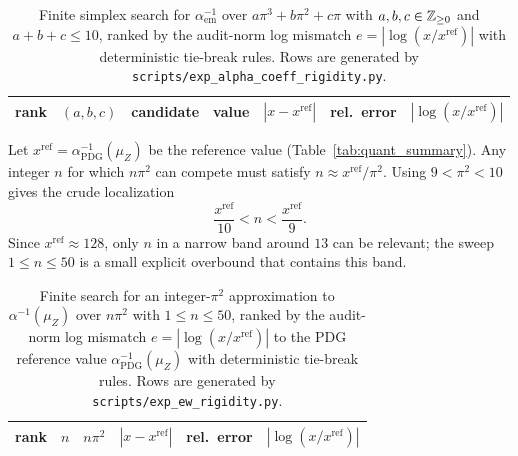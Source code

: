 \begin{table}[H]
\centering
\scriptsize
\setlength{\tabcolsep}{6pt}
\renewcommand{\arraystretch}{1.15}
\begin{tabular}{rllrrrr}
\toprule
rank & $(a,b,c)$ & candidate & value & $|x-x^{\mathrm{ref}}|$ & rel.\ error & $|\log(x/x^{\mathrm{ref}})|$ \\
\midrule
%
\end{tabular}
\caption{Finite simplex search for $\alpha_{\mathrm{em}}^{-1}$ over $a\pi^3+b\pi^2+c\pi$ with $a,b,c\in\mathbb{Z}_{\ge 0}$ and $a+b+c\le 10$, ranked by the audit-norm log mismatch $e=|\log(x/x^{\mathrm{ref}})|$ with deterministic tie-break rules. Rows are generated by \texttt{scripts/exp\_alpha\_coeff\_rigidity.py}.}
\label{tab:alpha_coeff_rigidity}
\end{table}

\begin{remark}
\label{rem:ew_alpha_pi2_nonvacuous}
Let $x^{\mathrm{ref}}=\alpha^{-1}_{\mathrm{PDG}}(\mu_Z)$ be the reference value (Table~\ref{tab:quant_summary}).
Any integer $n$ for which $n\pi^2$ can compete must satisfy $n\approx x^{\mathrm{ref}}/\pi^2$.
Using $9<\pi^2<10$ gives the crude localization
\[
\frac{x^{\mathrm{ref}}}{10}<n<\frac{x^{\mathrm{ref}}}{9}.
\]
Since $x^{\mathrm{ref}}\approx 128$, only $n$ in a narrow band around $13$ can be relevant; the sweep $1\le n\le 50$ is a small explicit overbound that contains this band.
\end{remark}

\begin{table}[H]
\centering
\scriptsize
\setlength{\tabcolsep}{8pt}
\renewcommand{\arraystretch}{1.15}
\begin{tabular}{rrrrrr}
\toprule
rank & $n$ & $n\pi^2$ & $|x-x^{\mathrm{ref}}|$ & rel.\ error & $|\log(x/x^{\mathrm{ref}})|$ \\
\midrule
%
\end{tabular}
\caption{Finite search for an integer-$\pi^2$ approximation to $\alpha^{-1}(\mu_Z)$ over $n\pi^2$ with $1\le n\le 50$, ranked by the audit-norm log mismatch $e=|\log(x/x^{\mathrm{ref}})|$ to the PDG reference value $\alpha^{-1}_{\mathrm{PDG}}(\mu_Z)$ with deterministic tie-break rules. Rows are generated by \texttt{scripts/exp\_ew\_rigidity.py}.}
\label{tab:ew_alpha_pi2_rigidity}
\end{table}

